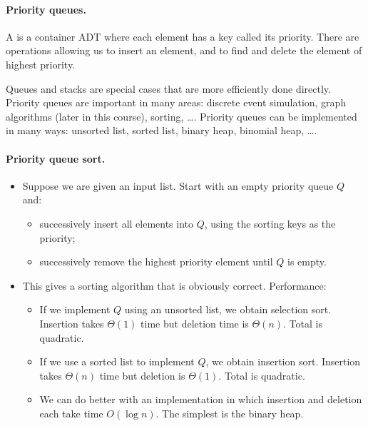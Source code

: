 \paragraph{Priority queues.}
\begin{Definition}
A  is a container ADT where each element 
has a key called its priority. There are operations allowing us to insert an 
element, and to find and delete the element of highest priority. 
\end{Definition}
Queues and stacks are special cases that are more efficiently done directly.
Priority queues are important in many areas: discrete event simulation, 
graph algorithms (later in this course), sorting, \dots .
Priority queues can be implemented in many ways: unsorted list, sorted 
list, binary heap, binomial heap, \dots . 

\paragraph{Priority queue sort.}
\begin{itemize}
\item Suppose we are given an input list. Start with an empty priority queue $Q$
 and:
\begin{itemize}
\item successively insert all elements into $Q$, using the sorting keys as the 
priority;
\item successively remove the highest priority element until $Q$ is empty. 
\end{itemize}
\item This gives a sorting algorithm that is obviously correct. Performance:
\begin{itemize}
\item If we implement $Q$ using an unsorted list, we obtain selection sort. 
Insertion takes $\Theta(1)$ time but deletion time is $\Theta(n)$. Total is quadratic.
\item If we use a sorted list to implement $Q$, we obtain insertion sort. 
Insertion takes $\Theta(n)$ time but deletion is $\Theta(1)$. Total is quadratic.
\item We can do better with an implementation in which insertion and deletion 
each take time $O(\log n)$. The simplest is the {binary heap}.
\end{itemize}
\end{itemize}

